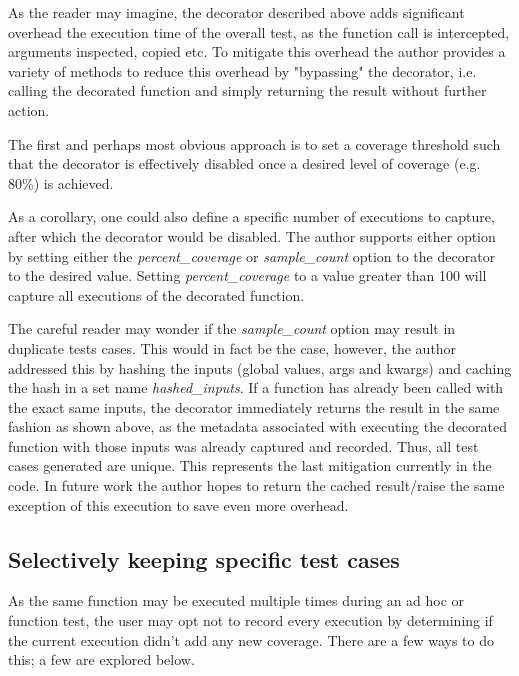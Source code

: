 As the reader may imagine, the decorator described above adds significant overhead 
the execution time of the overall test, as the function call is intercepted,
arguments inspected, copied etc.  To mitigate this overhead the author provides 
a variety of methods to 
reduce this overhead by "bypassing" the decorator, i.e. calling the decorated 
function and simply returning the result without further action.

The first and perhaps most obvious approach is to set a coverage threshold such 
that the decorator is effectively disabled once a desired level of coverage 
(e.g. 80\%) is achieved. 

As a corollary, one could also define a specific number 
of executions to capture, after which the decorator would be disabled. 
The author supports either option by setting either the \textit{percent\_coverage} or 
\textit{sample\_count} option to the decorator to the desired value.  Setting 
\textit{percent\_coverage} to a value greater than 100 will capture all 
executions of the decorated function.


The careful reader may wonder if the \textit{sample\_count} option may result in 
duplicate tests cases.  This would in fact be the case, however, the author 
addressed this by hashing the inputs (global values, args and kwargs) and 
caching the hash in a set name \textit{hashed\_inputs}.  If a function has
already been called with the exact same inputs, the decorator immediately returns
the result in the same fashion as shown above, as the metadata associated with
 executing the decorated function
with those inputs was already captured and recorded.  Thus, all test cases 
generated are unique.  This represents the last mitigation
currently in the code.  In future work the author hopes to return the cached 
result/raise the same exception of this execution to save even more overhead.  

\subsection{Selectively keeping specific test cases}\label{sec:tuning-1}
As the same function may be executed multiple times during an ad hoc or 
function test, the user may opt not to record every execution by determining
 if the current execution didn’t add any new coverage. There are a few 
 ways to do this; a few are explored below.
 
